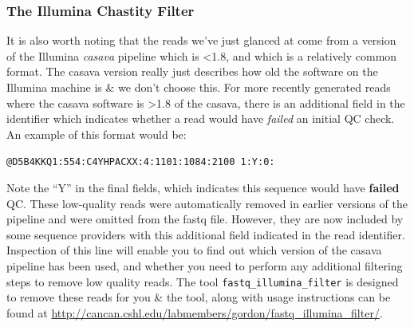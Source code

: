\subsubsection{The Illumina Chastity Filter}
\begin{information}
It is also worth noting that the reads we've just glanced at come from a version of the Illumina \textit{casava} pipeline which is \textless 1.8, and which is a relatively common format.
The casava version really just describes how old the software on the Illumina machine is \& we don't choose this.
For more recently generated reads where the casava software is \textgreater 1.8 of the casava, there is an additional field in the identifier which indicates whether a read would have \textit{failed} an initial QC check.
An example of this format would be:
\begin{center}
\texttt{@D5B4KKQ1:554:C4YHPACXX:4:1101:1084:2100 1:Y:0:}
\end{center}
Note the ``Y'' in the final fields, which indicates this sequence would have \textbf{failed} QC.
These low-quality reads were automatically removed in earlier versions of the pipeline and were omitted from the fastq file.
However, they are now included by some sequence providers with this additional field indicated in the read identifier.
Inspection of this line will enable you to find out which version of the casava pipeline has been used, and whether you need to perform any additional filtering steps to remove low quality reads.
The tool \texttt{fastq\_illumina\_filter} is designed to remove these reads for you \& the tool, along with usage instructions can be found at \url{http://cancan.cshl.edu/labmembers/gordon/fastq\_illumina\_filter/}.\\
\end{information}


